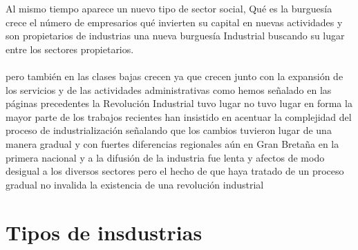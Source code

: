 \documentclass[12pt]{book}
\begin{document}
Al mismo tiempo aparece un nuevo tipo de sector social, Qué es la burguesía crece el número de empresarios qué invierten su capital en nuevas actividades y son propietarios de industrias una nueva burguesía Industrial buscando su lugar entre los sectores propietarios.
\\
\\
pero también en las clases bajas crecen ya que crecen junto con la expansión de los servicios y de las actividades administrativas como hemos señalado en las páginas precedentes la Revolución Industrial tuvo lugar no tuvo lugar en forma la mayor parte de los trabajos recientes han insistido en acentuar la complejidad del proceso de industrialización señalando que los cambios tuvieron lugar de una manera gradual y con fuertes diferencias regionales aún en Gran Bretaña en la primera nacional y a la difusión de la industria fue lenta y afectos de modo desigual a los diversos sectores pero el hecho de que haya tratado de un proceso gradual no invalida la existencia de una revolución industrial


\section{Tipos de insdustrias}
\end{document}

